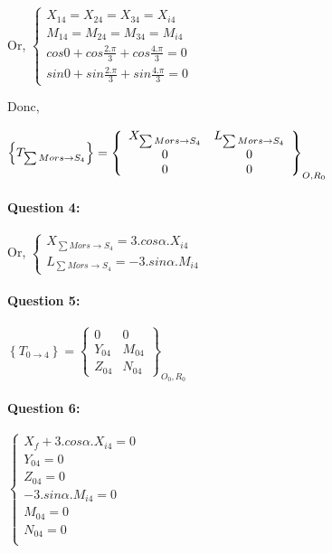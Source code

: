 Or, $\left\{\begin{array}{l}
X_{14}=X_{24}=X_{34}=X_{i4} \\
M_{14}=M_{24}=M_{34}=M_{i4} \\
cos0+cos\frac{2.\pi}{3}+cos\frac{4.\pi}{3}=0 \\
sin0+sin\frac{2.\pi}{3}+sin\frac{4.\pi}{3}=0
\end{array}\right.$

Donc, 

$\left\{T_{\sum Mors \rightarrow S_4}\right\}=\left\{
  \begin{array}{c c}
  X_{\sum Mors \rightarrow S_4} & L_{\sum Mors \rightarrow S_4} \\
  0 & 0 \\
  0 & 0
  \end{array}\right\}_{O,R_0}$

\paragraph{Question 4:}

Or, $\left\{\begin{array}{l}
X_{\sum Mors \rightarrow S_4}=3.cos\alpha.X_{i4} \\
L_{\sum Mors \rightarrow S_4}=-3.sin\alpha.M_{i4}
\end{array}\right.$

\paragraph{Question 5:}

$\left\{T_{0\rightarrow 4}\right\}=\left\{\begin{array}{cc}
0 & 0 \\ Y_{04} & M_{04} \\ Z_{04} & N_{04}
\end{array}\right\}_{O_0,R_0}$

\paragraph{Question 6:}

$\left\{\begin{array}{l}
X_f+3.cos\alpha.X_{i4}=0 \\
Y_{04}=0 \\
Z_{04}=0 \\
-3.sin\alpha.M_{i4}=0 \\
M_{04}=0 \\
N_{04}=0 \\
\end{array}\right.$


